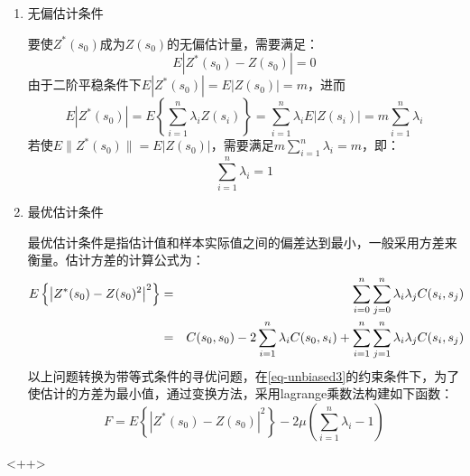 \begin{enumerate}
    \item 无偏估计条件

        要使$Z^*(s_0)$成为$Z(s_0)$的无偏估计量，需要满足：
        \begin{equation}
            E\left| Z^*(s_0)-Z(s_0) \right| = 0
            \label{eq-unbiased1}
        \end{equation}
        由于二阶平稳条件下$E| Z^*(s_0) | = E | Z(s_0) | = m$，进而
        \begin{equation}
            E | Z^*(s_0) | = E \left\{  \sum\limits_{i=1}^{n}\lambda_iZ(s_i) \right\} = \sum\limits_{i=1}^{n}\lambda_i E | Z(s_i) | = m \sum\limits_{i=1}^{n} \lambda_i
            \label{eq-unbiased2}
        \end{equation}
        若使$E\| Z^*(s_0) \| = E | Z(s_0) |$，需要满足$m\sum\limits_{i=1}^{n}\lambda_i = m$，即：
        \begin{equation}
            \sum\limits_{i=1}^{n}\lambda_i = 1
            \label{eq-unbiased3}
        \end{equation}
    \item 最优估计条件
    
        最优估计条件是指估计值和样本实际值之间的偏差达到最小，一般采用方差来衡量。估计方差的计算公式为：
        \begin{eqnarray}
            E\left\{ \left| Z^*(s_0) - Z(s_0)^2 \right|^2 \right\} &=& \sum\limits_{i=0}^{n}\sum\limits_{j=0}^{n}\lambda_i\lambda_jC(s_i,s_j) \notag \\
            &=& C(s_0,s_0) - 2\sum\limits_{i=1}^{n}\lambda_iC(s_0,s_i)+\sum\limits_{i=1}^{n}\sum\limits_{j=1}^{n}\lambda_i\lambda_jC(s_i,s_j)
            \label{eq-optivar}
        \end{eqnarray}
        以上问题转换为带等式条件的寻优问题，在\cref{eq-unbiased3}的约束条件下，为了使估计的方差为最小值，通过变换方法，采用lagrange乘数法构建如下函数：
        \begin{equation}
            F= E\left\{ \left| Z^*(s_0) - Z(s_0) \right|^2 \right\} - 2\mu\left( \sum\limits_{i=1}^{n} \lambda_i -1 \right)
            \label{eq-transfomredvar}
        \end{equation}
\end{enumerate}<++>
